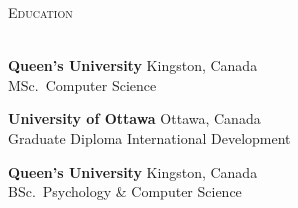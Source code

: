\documentclass[letterpaper]{article}
\newcommand{\lineunder} {
        \vspace*{-8pt} \\
        \hspace*{-18pt} \hrulefill \\
    }
\newcommand{\header} [1] {
        {\hspace*{-18pt}\vspace*{6pt} \textsc{#1}}
        \vspace*{-6pt} \lineunder
        \vspace{1mm}
    }
\newcommand{\university}[3]{
        \textbf{#1}  %
        \hfill #2\\  %
        #3\\         %
        \vspace{2mm}
    }
\begin{document}
\vspace{1mm}



\header{Education}
    \university
        {Queen's University}
        {Kingston, Canada}
        {MSc.~Computer Science}

    \university
        {University of Ottawa}
        {Ottawa, Canada}
        {Graduate Diploma International Development}

    \university
        {Queen's University}
        {Kingston, Canada}
        {BSc.~Psychology \& Computer Science}
\end{document}
